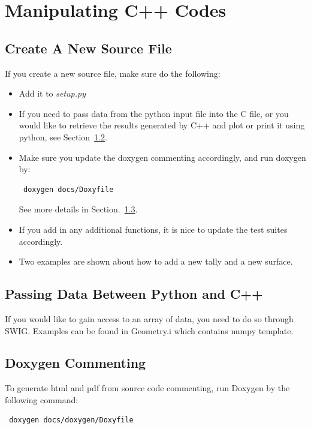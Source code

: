\documentclass[titlepage]{article}
\begin{document}
\clearpage
\section{Manipulating C++ Codes}\label{C++}
\subsection{Create A New Source File}
If you create a new source file, make sure do the following: 

\begin{itemize}
\item Add it to \textit{setup.py}

\item If you need to pass data from the python input file into the C file, or you would like to retrieve the results generated by C++ and plot or print it using python, see Section~\ref{data}. 

\item Make sure you update the doxygen commenting accordingly, and run doxygen by:
\begin{verbatim}
 doxygen docs/Doxyfile
\end{verbatim}
See more details in Section.~\ref{doxygen}. 

\item If you add in any additional functions, it is nice to update the test suites accordingly. 

\item Two examples are shown about how to add a new tally and a new surface. 
\end{itemize}



\clearpage
\subsection{Passing Data Between Python and C++} \label{data}
If you would like to gain access to an array of data, you need to do so through SWIG. Examples can be found in Geometry.i which contains numpy template. 



\clearpage
\subsection{Doxygen Commenting} \label{doxygen}
To generate html and pdf from source code commenting, run Doxygen by the following command:
\begin{verbatim}
 doxygen docs/doxygen/Doxyfile
\end{verbatim}
\end{document}
